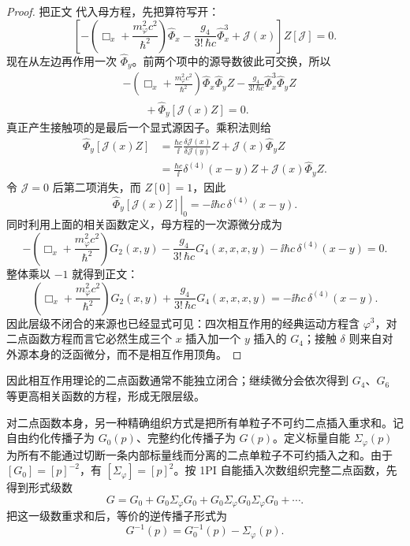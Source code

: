 \begin{proof}
把正文 代入母方程，先把算符写开：
\begin{equation*}
\left[
-\left(\Box_x+\frac{m_\varphi^2c^2}{\hbar^2}\right)\widehat\Phi_x
-\frac{g_4}{3!\,\hbar c}\widehat\Phi_x^3
+\mathcal J(x)
\right]Z[\mathcal J]=0.
\end{equation*}
现在从左边再作用一次 $\widehat\Phi_y$。前两个项中的源导数彼此可交换，所以
\begin{align*}
&-\left(\Box_x+\frac{m_\varphi^2c^2}{\hbar^2}\right)
\widehat\Phi_x\widehat\Phi_yZ
-\frac{g_4}{3!\,\hbar c}
\widehat\Phi_x^3\widehat\Phi_yZ\\
&\qquad
+\widehat\Phi_y\!\left[\mathcal J(x)Z\right]=0.
\end{align*}
真正产生接触项的是最后一个显式源因子。乘积法则给
\begin{align*}
\widehat\Phi_y\!\left[\mathcal J(x)Z\right]
&=\frac{\hbar c}{\ii}
\frac{\delta\mathcal J(x)}{\delta\mathcal J(y)}Z
+\mathcal J(x)\widehat\Phi_yZ\\
&=\frac{\hbar c}{\ii}\delta^{(4)}(x-y)Z
+\mathcal J(x)\widehat\Phi_yZ.
\end{align*}
令 $\mathcal J=0$ 后第二项消失，而 $Z[0]=1$，因此
\begin{equation*}
\left.\widehat\Phi_y[\mathcal J(x)Z]\right|_0
=-\ii\hbar c\,\delta^{(4)}(x-y).
\end{equation*}
同时利用上面的相关函数定义，母方程的一次源微分成为
\begin{equation*}
-\left(\Box_x+\frac{m_\varphi^2c^2}{\hbar^2}\right)G_2(x,y)
-\frac{g_4}{3!\,\hbar c}G_4(x,x,x,y)
-\ii\hbar c\,\delta^{(4)}(x-y)=0.
\end{equation*}
整体乘以 $-1$ 就得到正文：
\begin{equation*}
\left(\Box_x+\frac{m_\varphi^2c^2}{\hbar^2}\right)G_2(x,y)
+\frac{g_4}{3!\,\hbar c}G_4(x,x,x,y)
=-\ii\hbar c\,\delta^{(4)}(x-y).
\end{equation*}
因此层级不闭合的来源也已经显式可见：四次相互作用的经典运动方程含 $\varphi^3$，对二点函数方程而言它必然生成三个 $x$ 插入加一个 $y$ 插入的 $G_4$；接触 $\delta$ 则来自对外源本身的泛函微分，而不是相互作用顶角。
\end{proof}
因此相互作用理论的二点函数通常不能独立闭合；继续微分会依次得到 $G_4$、$G_6$ 等更高相关函数的方程，形成无限层级。

对二点函数本身，另一种精确组织方式是把所有单粒子不可约二点插入重求和。记自由约化传播子为 $G_0(p)$、完整约化传播子为 $G(p)$。定义标量自能 $\Sigma_\varphi(p)$ 为所有不能通过切断一条内部标量线而分离的二点单粒子不可约插入之和。由于 $[G_0]=[p]^{-2}$，有 $[\Sigma_\varphi]=[p]^2$。按 1PI 自能插入次数组织完整二点函数，先得到形式级数
\begin{equation}
 \boxed{
 G
 =G_0+G_0\Sigma_\varphi G_0
 +G_0\Sigma_\varphi G_0\Sigma_\varphi G_0+\cdots .}
 \label{eq:exact-dyson-series-scalar-r68}
\end{equation}
把这一级数重求和后，等价的逆传播子形式为
\begin{equation}
 \boxed{G^{-1}(p)=G_0^{-1}(p)-\Sigma_\varphi(p).}
 \label{eq:exact-dyson-scalar-SI-r15}
\end{equation}

